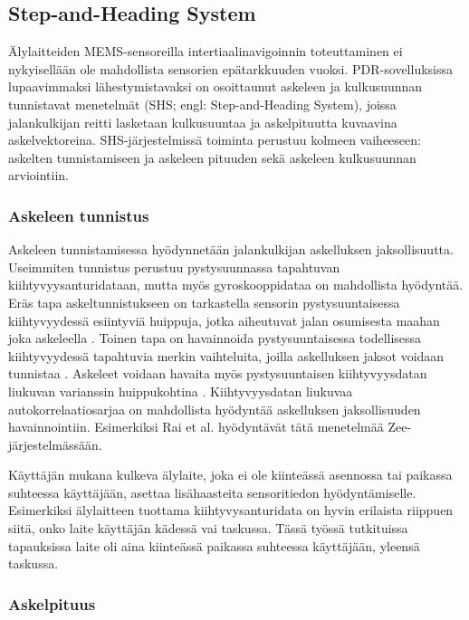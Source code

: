 \subsection{Step-and-Heading System}

Älylaitteiden MEMS-sensoreilla intertiaalinavigoinnin toteuttaminen ei
nykyisellään ole mahdollista sensorien epätarkkuuden vuoksi.  PDR-sovelluksissa
lupaavimmaksi lähestymistavaksi on osoittaunut askeleen ja kulkusuunnan
tunnistavat menetelmät (SHS; engl: Step-and-Heading System), joissa
jalankulkijan reitti lasketaan kulkusuuntaa ja askelpituutta kuvaavina
askelvektoreina. SHS-järjestelmissä toiminta perustuu kolmeen vaiheeseen:
askelten tunnistamiseen ja askeleen pituuden sekä askeleen kulkusuunnan
arviointiin.

\subsubsection{Askeleen tunnistus}

Askeleen tunnistamisessa hyödynnetään jalankulkijan askelluksen jaksollisuutta.
Useimmiten tunnistus perustuu pystysuunnassa tapahtuvan kiihtyvyysanturidataan,
mutta myös gyroskooppidataa on mahdollista hyödyntää.  Eräs tapa
askeltunnistukseen on tarkastella sensorin pystysuuntaisessa kiihtyvyydessä
esiintyviä huippuja, jotka aiheutuvat jalan osumisesta maahan joka askeleella
\cite{wang2012}.  Toinen tapa on havainnoida pystysuuntaisessa todellisessa
kiihtyvyydessä tapahtuvia merkin vaihteluita, joilla askelluksen jaksot voidaan
tunnistaa \cite{fadjukoff2013}. Askeleet voidaan havaita myös pystysuuntaisen
kiihtyvyysdatan liukuvan varianssin huippukohtina \cite{steinhoff2010}.
Kiihtyvyysdatan liukuvaa autokorrelaatiosarjaa on mahdollista hyödyntää
askelluksen jaksollisuuden havainnointiin. Esimerkiksi Rai et al.
\cite{rai2012} hyödyntävät tätä menetelmää Zee-järjestelmässään.

Käyttäjän mukana kulkeva älylaite, joka ei ole kiinteässä asennossa tai
paikassa suhteessa käyttäjään, asettaa lisähaasteita sensoritiedon
hyödyntämiselle. Esimerkiksi älylaitteen tuottama kiihtyvysanturidata on hyvin
erilaista riippuen siitä, onko laite käyttäjän kädessä vai taskussa. Tässä
työssä tutkituissa tapauksissa laite oli aina kiinteässä paikassa suhteessa
käyttäjään, yleensä taskussa.

\subsubsection{Askelpituus}

